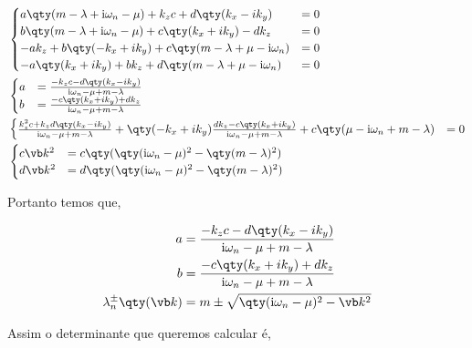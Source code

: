 \documentclass[twoside]{amsart}
\numberwithin{equation}{section}
\newcommand{\imm}{\textup{i}}
\begin{document}
\begin{refsection}
\begin{align}
    &\begin{cases}
        a\qty(m-\lambda+\imm\omega_n-\mu)+k_z c+d\qty(k_x-ik_y)&=0\\
        b\qty(m-\lambda+\imm\omega_n-\mu)+c\qty(k_x+ik_y)-dk_z&=0\\
        -ak_z+b\qty(-k_x+ik_y)+c\qty(m-\lambda+\mu-\imm\omega_n)&=0\\
        -a\qty(k_x+ik_y)+bk_z+d\qty(m-\lambda+\mu-\imm\omega_n)&=0
    \end{cases}\\
    &\begin{cases}
        a&=\frac{-k_zc-d\qty(k_x-ik_y)}{\imm\omega_n-\mu+m-\lambda}\\
        b&=\frac{-c\qty(k_x+ik_y)+dk_z}{\imm\omega_n-\mu+m-\lambda}
    \end{cases}\\
    &\begin{cases}
        \frac{k_z^2c+k_zd\qty(k_x-ik_y)}{\imm\omega_n-\mu+m-\lambda}+\qty(-k_x+ik_y)\frac{dk_z-c\qty(k_x+ik_y)}{\imm\omega_n-\mu+m-\lambda}+c\qty(\mu-\imm\omega_n+m-\lambda)&=0
    \end{cases}\\
    &\begin{cases}
        c\vb k^2&=c\qty(\qty(\imm\omega_n-\mu)^2-\qty(m-\lambda)^2)\\
        d\vb k^2&=d\qty(\qty(\imm\omega_n-\mu)^2-\qty(m-\lambda)^2)
    \end{cases}
\end{align}

Portanto temos que,

\begin{align}
    a&=\frac{-k_zc-d\qty(k_x-ik_y)}{\imm\omega_n-\mu+m-\lambda}\\
    b&=\frac{-c\qty(k_x+ik_y)+dk_z}{\imm\omega_n-\mu+m-\lambda}\\
    \lambda_n^\pm\qty(\vb k)&=m\pm\sqrt{\qty(\imm\omega_n-\mu)^2-\vb k^2}
\end{align}

Assim o determinante que queremos calcular é,


\end{refsection}
\end{document}
